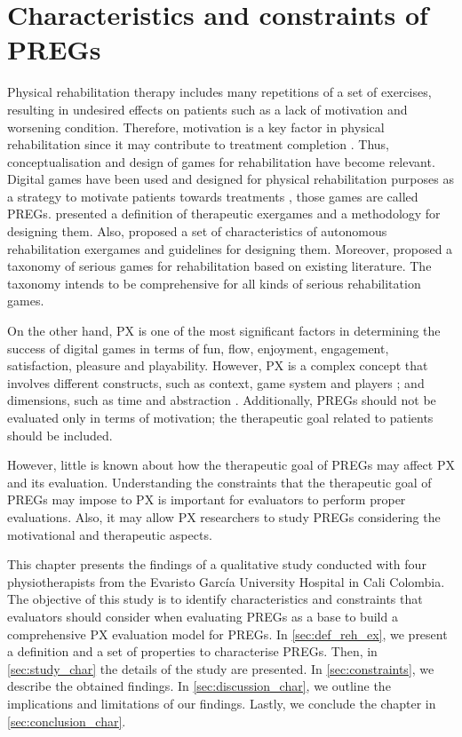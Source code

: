 \chapter{Characteristics and constraints of PREGs}
\label{ch:characterising}
Physical rehabilitation therapy includes many repetitions of a set of exercises, resulting in undesired effects on patients such as a lack of motivation and worsening condition. Therefore, motivation is a key factor in physical rehabilitation since it may contribute to treatment completion \autocite{Shelton2015}. Thus, conceptualisation and design of games for rehabilitation have become relevant. Digital games have been used and designed for physical rehabilitation purposes as a strategy to motivate patients towards treatments \autocite{Brokaw2015,Burke2009,Hernandez2013,Lewis2012}, those games are called \acp{PREG}. \textcite{Pirovano2016} presented a definition of therapeutic exergames and a methodology for designing them. Also, \textcite{PirovanoAdvisor2012} proposed a set of characteristics of autonomous rehabilitation exergames and guidelines for designing them. Moreover, \textcite{Rego2018} proposed a taxonomy of serious games for rehabilitation based on existing literature. The taxonomy intends to be comprehensive for all kinds of serious rehabilitation games.

On the other hand, \ac{PX} is one of the most significant factors in determining the success of digital games in terms of fun, flow, enjoyment, engagement, satisfaction, pleasure and playability. However, \ac{PX} is a complex concept that involves different constructs, such as context, game system and players \autocite{Engl2013,Fernandez2008,Nackea2}; and dimensions, such as time and abstraction \autocite{Engl2013,Nackea2}. Additionally, \acp{PREG} should not be evaluated only in terms of motivation; the therapeutic goal related to patients should be included.

However, little is known about how the therapeutic goal of \acp{PREG} may affect \ac{PX} and its evaluation. Understanding the constraints that the therapeutic goal of \acp{PREG} may impose to \ac{PX} is important for evaluators to perform proper evaluations. Also, it may allow \ac{PX} researchers to study \acp{PREG} considering the motivational and therapeutic aspects.

This chapter presents the findings of a qualitative study conducted with four physiotherapists from the Evaristo Garc\'ia University Hospital in Cali Colombia. The objective of this study is to identify characteristics and constraints that evaluators should consider when evaluating \acp{PREG} as a base to build a comprehensive \ac{PX} evaluation model for \acp{PREG}. In \autoref{sec:def_reh_ex}, we present a definition and a set of properties to characterise \acp{PREG}. Then, in \autoref{sec:study_char} the details of the study are presented. In \autoref{sec:constraints}, we describe the obtained findings. In \autoref{sec:discussion_char}, we outline the implications and limitations of our findings. Lastly, we conclude the chapter in \autoref{sec:conclusion_char}.

